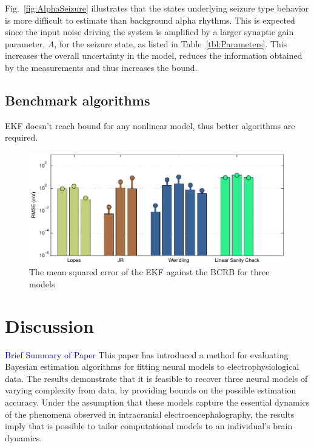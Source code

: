 \documentclass{article}
\newcommand{\brian}[1]{\textcolor{blue}{#1}}
\begin{document}
Fig.~\ref{fig:AlphaSeizure} illustrates that the states underlying seizure type behavior is more difficult to estimate than background alpha rhythms. This is expected since the input noise driving the system is amplified by a larger synaptic gain parameter, $A$, for the seizure state, as listed in Table~\ref{tbl:Parameters}. This increases the overall uncertainty in the model, reduces the information obtained by the measurements and thus increases the bound.

\subsection{Benchmark algorithms}

EKF doesn't reach bound for any nonlinear model, thus better algorithms are required.

\begin{figure}[ht]
  \begin{center}
    \includegraphics{./figures/pdf/CRBbar}
  \end{center}
  \caption{The mean squared error of the EKF against the BCRB for three models}
  \label{fig:CrbBar}
\end{figure}


\section{Discussion}
\brian{Brief Summary of Paper}
This paper has introduced a method for evaluating Bayesian estimation algorithms for fitting neural models to electrophysiological data. The results demonstrate that it is feasible to recover three neural models of varying complexity from data, by providing bounds on the possible estimation accuracy. Under the assumption that these models capture the essential dynamics of the phenomena observed in intracranial electroencephalography, the results imply that is possible to tailor computational models to an individual's brain dynamics. 
\end{document}
